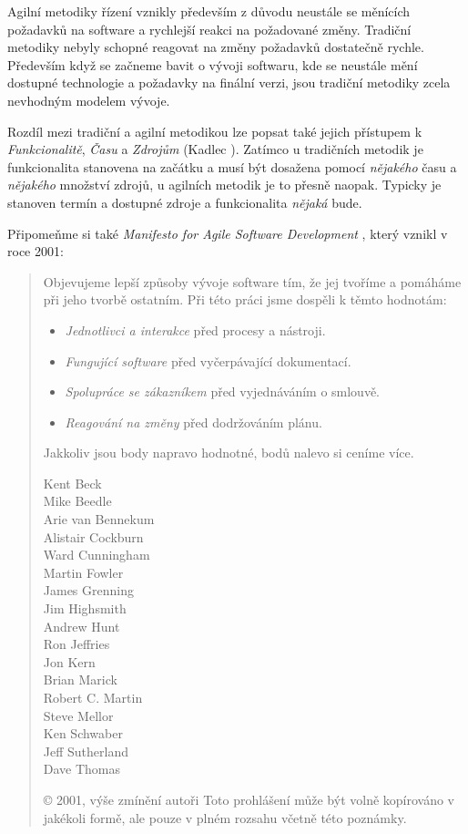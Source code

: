 Agilní metodiky řízení vznikly především z důvodu neustále se měnících požadavků na software a rychlejší reakci na požadované změny. Tradiční metodiky nebyly schopné reagovat na změny požadavků dostatečně rychle. Především když se začneme bavit o vývoji softwaru, kde se neustále mění dostupné technologie a požadavky na finální verzi, jsou tradiční metodiky zcela nevhodným modelem vývoje.

Rozdíl mezi tradiční a agilní metodikou lze popsat také jejich přístupem k \emph{Funkcionalitě}, \emph{Času} a \emph{Zdrojům} (Kadlec \cite{kadlec}). Zatímco u tradičních metodik je funkcionalita stanovena na začátku a musí být dosažena pomocí \emph{nějakého} času a \emph{nějakého} množství zdrojů, u agilních metodik je to přesně naopak. Typicky je stanoven termín a dostupné zdroje a funkcionalita \emph{nějaká} bude.

Připomeňme si také \emph{Manifesto for Agile Software Development} \cite{manifesto}, který vznikl v roce 2001:

\begin{quote}
Objevujeme lepší způsoby vývoje software tím,
že jej tvoříme a pomáháme při jeho tvorbě ostatním.
Při této práci jsme dospěli k těmto hodnotám:
\begin{itemize}
	\item \emph{Jednotlivci a interakce} před procesy a nástroji.
	\item \emph{Fungující software} před vyčerpávající dokumentací.
	\item \emph{Spolupráce se zákazníkem} před vyjednáváním o smlouvě.
	\item \emph{Reagování na změny} před dodržováním plánu.
\end{itemize}
Jakkoliv jsou body napravo hodnotné,
bodů nalevo si ceníme více.

\begin{multicols}{3}
Kent Beck\\
Mike Beedle\\
Arie van Bennekum\\
Alistair Cockburn\\
Ward Cunningham\\
Martin Fowler\\
James Grenning\\
Jim Highsmith\\
Andrew Hunt\\
Ron Jeffries\\
Jon Kern\\
Brian Marick\\
Robert C. Martin\\
Steve Mellor\\
Ken Schwaber\\
Jeff Sutherland\\
Dave Thomas\\
\end{multicols}

{\color{gray}
© 2001, výše zmínění autoři
Toto prohlášení může být volně kopírováno v jakékoli formě,
ale pouze v plném rozsahu včetně této poznámky.
}

\end{quote}

